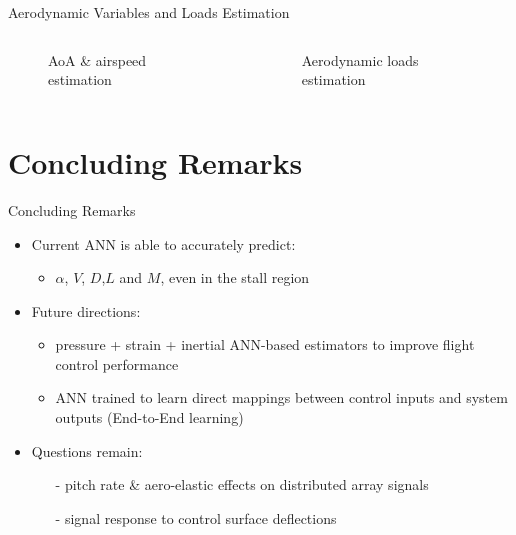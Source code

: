 \documentclass[aspectratio=169]{beamer}            %
\begin{document}
\begin{frame}{Aerodynamic Variables and Loads Estimation}

  \vspace{-2.0em}
	\begin{columns}
	  \begin{column}{0.49\textwidth}
		  \begin{figure}[!htb]
        \centering
				
				\vspace{-1.25em}
				\caption{AoA \& airspeed estimation}
				\label{fig:AeroVarEst_TimeHist}
      \end{figure}
		\end{column}
    \begin{column}{0.49\textwidth}
		  \begin{figure}[!htb]
        \centering
				
				\vspace{-1.25em}
				\caption{Aerodynamic loads estimation}
				\label{fig:AeroLoadsEst_TimeHist}
      \end{figure}
		\end{column}
	\end{columns}

\end{frame}

\section{Concluding Remarks}
\begin{frame}{Concluding Remarks}

  \pause
  \begin{itemize}[<+->]
			\item{Current ANN is able to accurately predict:}
			\begin{itemize}[<+->]
				\item{${\alpha}$, ${V}$, ${D}$,${L}$ and ${M}$, even in the stall region}
			\end{itemize}
		\item{Future directions:}
			\begin{itemize}[<+->]
				\item{pressure + strain + inertial ANN-based estimators to improve flight control performance}
				\item{ANN trained to learn direct mappings between control inputs and system outputs (End-to-End learning)}
			\end{itemize}
		\item{Questions remain:}
		\begin{itemize}[<+->]
		  \item[-]{pitch rate \& aero-elastic effects on distributed array signals}
			\item[-]{signal response to control surface deflections}
		\end{itemize}
  \end{itemize}
	  
\end{frame}
\end{document}
